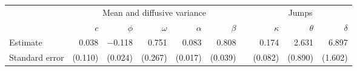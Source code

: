\begin{tabular}{@{}l rrrrr c rrr@{}}
\toprule
 & \multicolumn{5}{c}{Mean and diffusive variance} & & \multicolumn{3}{c}{Jumps} \\
\cmidrule(lr){2-6}\cmidrule(l){8-10}
 & $c$ & $\phi$ & $\omega$ & $\alpha$ & $\beta$ & & $\kappa$ & $\theta$ & $\delta$ \\
\midrule
Estimate & 0.038 & $-$0.118 & 0.751 & 0.083 & 0.808 & & 0.174 & 2.631 & 6.897 \\
Standard error & (0.110) & (0.024) & (0.267) & (0.017) & (0.039) & & (0.082) & (0.890) & (1.602) \\
\bottomrule
\end{tabular}
